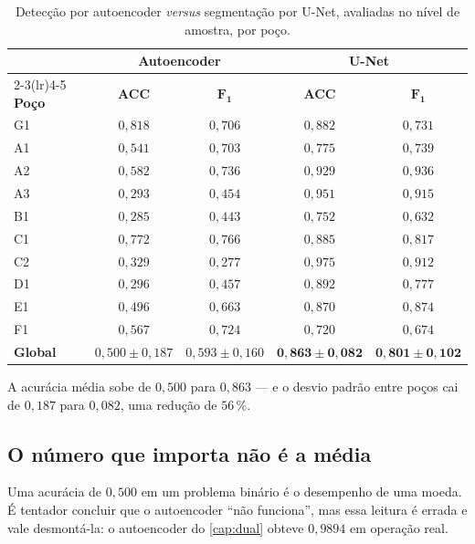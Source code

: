 \begin{table}[htbp]
\centering
\caption{Detecção por autoencoder \emph{versus} segmentação por U-Net, avaliadas no
nível de amostra, por poço.}
\label{tab:seg-comparacao}
\small
\begin{tabular}{lcccc}
\toprule
& \multicolumn{2}{c}{\textbf{Autoencoder}} & \multicolumn{2}{c}{\textbf{U-Net}} \\
\cmidrule(lr){2-3}\cmidrule(lr){4-5}
\textbf{Poço} & \textbf{ACC} & $\bm{F_1}$ & \textbf{ACC} & $\bm{F_1}$ \\
\midrule
G1 & $0{,}818$ & $0{,}706$ & $0{,}882$ & $0{,}731$ \\
A1 & $0{,}541$ & $0{,}703$ & $0{,}775$ & $0{,}739$ \\
A2 & $0{,}582$ & $0{,}736$ & $0{,}929$ & $0{,}936$ \\
A3 & $0{,}293$ & $0{,}454$ & $0{,}951$ & $0{,}915$ \\
B1 & $0{,}285$ & $0{,}443$ & $0{,}752$ & $0{,}632$ \\
C1 & $0{,}772$ & $0{,}766$ & $0{,}885$ & $0{,}817$ \\
C2 & $0{,}329$ & $0{,}277$ & $0{,}975$ & $0{,}912$ \\
D1 & $0{,}296$ & $0{,}457$ & $0{,}892$ & $0{,}777$ \\
E1 & $0{,}496$ & $0{,}663$ & $0{,}870$ & $0{,}874$ \\
F1 & $0{,}567$ & $0{,}724$ & $0{,}720$ & $0{,}674$ \\
\midrule
\textbf{Global} & $0{,}500 \pm 0{,}187$ & $0{,}593 \pm 0{,}160$ &
                  $\bm{0{,}863 \pm 0{,}082}$ & $\bm{0{,}801 \pm 0{,}102}$ \\
\bottomrule
\end{tabular}
\end{table}

\begin{resultadochave}
A acurácia média sobe de $0{,}500$ para $0{,}863$ --- e o desvio padrão entre poços cai
de $0{,}187$ para $0{,}082$, uma redução de $56\,\%$.
\end{resultadochave}

\subsection{O número que importa não é a média}

Uma acurácia de $0{,}500$ em um problema binário é o desempenho de uma moeda. É tentador
concluir que o autoencoder ``não funciona'', mas essa leitura é errada e vale
desmontá-la: o autoencoder do \cref{cap:dual} obteve $0{,}9894$ em operação real.

